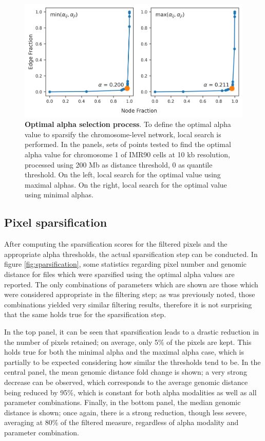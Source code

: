 \begin{figure}[h]
  \centering 
  \includegraphics[width=1\textwidth]{alpha_tables.png}
  \caption{\textbf{Optimal alpha selection process}. To define the optimal alpha value to sparsify the chromosome-level network, local search is performed. In the panels, sets of points tested to find the optimal alpha value for chromosome 1 of IMR90 cells at 10 kb resolution, processed using 200 Mb as distance threshold, 0 as quantile threshold. On the left, local search for the optimal value using maximal alphas. On the right, local search for the optimal value using minimal alphas.}
  \label{fig:alphas}
\end{figure}

\subsection{Pixel sparsification}

After computing the sparsification scores for the filtered pixels and the appropriate alpha thresholds, the actual sparsification step can be conducted. In figure \ref{fig:sparsification}, some statistics regarding pixel number and genomic distance for files which were sparsified using the optimal alpha values are reported. The only combinations of parameters which are shown are those which were considered appropriate in the filtering step; as was previously noted, those combinations yielded very similar filtering results, therefore it is not surprising that the same holds true for the sparsification step.

In the top panel, it can be seen that sparsification leads to a drastic reduction in the number of pixels retained; on average, only 5\% of the pixels are kept. This holds true for both the minimal alpha and the maximal alpha case, which is partially to be expected considering how similar the thresholds tend to be. In the central panel, the mean genomic distance fold change is shown; a very strong decrease can be observed, which corresponds to the average genomic distance being reduced by 95\%, which is constant for both alpha modalities as well as all parameter combinations. Finally, in the bottom panel, the median genomic distance is shown; once again, there is a strong reduction, though less severe, averaging at 80\% of the filtered measure, regardless of alpha modality and parameter combination.

